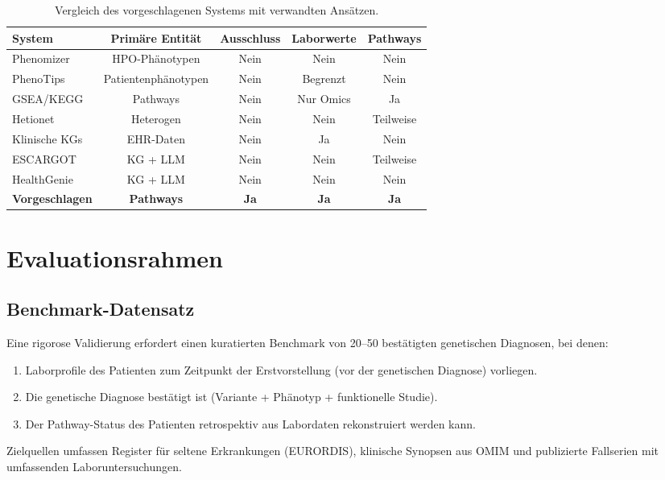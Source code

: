 \documentclass[12pt,a4paper]{article}
\begin{document}
\begin{table}[H]
\centering
\caption{Vergleich des vorgeschlagenen Systems mit verwandten Ansätzen.}
\label{tab:comparison}
\begin{tabular}{lcccc}
\toprule
\textbf{System} & \textbf{Primäre Entität} & \textbf{Ausschluss} & \textbf{Laborwerte} & \textbf{Pathways} \\
\midrule
Phenomizer & HPO-Phänotypen & Nein & Nein & Nein \\
PhenoTips & Patientenphänotypen & Nein & Begrenzt & Nein \\
GSEA/KEGG & Pathways & Nein & Nur Omics & Ja \\
Hetionet & Heterogen & Nein & Nein & Teilweise \\
Klinische KGs & EHR-Daten & Nein & Ja & Nein \\
ESCARGOT & KG + LLM & Nein & Nein & Teilweise \\
HealthGenie & KG + LLM & Nein & Nein & Nein \\
\textbf{Vorgeschlagen} & \textbf{Pathways} & \textbf{Ja} & \textbf{Ja} & \textbf{Ja} \\
\bottomrule
\end{tabular}
\end{table}

\section{Evaluationsrahmen}
\label{sec:evaluation}

\subsection{Benchmark-Datensatz}

Eine rigorose Validierung erfordert einen kuratierten Benchmark von 20--50 bestätigten genetischen Diagnosen, bei denen:
\begin{enumerate}
    \item Laborprofile des Patienten zum Zeitpunkt der Erstvorstellung (vor der genetischen Diagnose) vorliegen.
    \item Die genetische Diagnose bestätigt ist (Variante + Phänotyp + funktionelle Studie).
    \item Der Pathway-Status des Patienten retrospektiv aus Labordaten rekonstruiert werden kann.
\end{enumerate}

Zielquellen umfassen Register für seltene Erkrankungen (EURORDIS), klinische Synopsen aus OMIM und publizierte Fallserien mit umfassenden Laboruntersuchungen.
\end{document}
